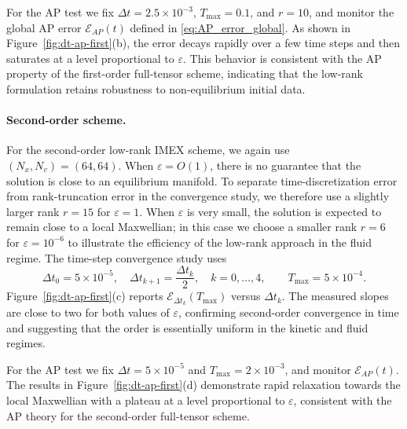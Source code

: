 \documentclass[]{article}
\numberwithin{equation}{section}
\begin{document}
For the AP test we fix $\Delta t=2.5\times 10^{-3}$, $T_{\max}=0.1$, and $r=10$, and monitor the global AP error $\mathcal E_{AP}(t)$ defined in \eqref{eq:AP_error_global}.
As shown in Figure~\ref{fig:dt-ap-first}(b), the error decays rapidly over a few time steps and then saturates at a level proportional to $\varepsilon$.
This behavior is consistent with the AP property of the first-order full-tensor scheme, indicating that the low-rank formulation retains robustness to non-equilibrium initial data.

\paragraph{Second-order scheme.}
For the second-order low-rank IMEX scheme, we again use $(N_x,N_v)=(64,64)$.
When $\varepsilon=O(1)$, there is no guarantee that the solution is close to an equilibrium manifold. To separate time-discretization error from rank-truncation error in the convergence study, we therefore use a slightly larger rank $r=15$ for $\varepsilon=1$.
When $\varepsilon$ is very small, the solution is expected to remain close to a local Maxwellian; in this case we choose a smaller rank $r=6$ for $\varepsilon=10^{-6}$ to illustrate the efficiency of the low-rank approach in the fluid regime. The time-step convergence study uses
\[
  \Delta t_0 = 5\times 10^{-5},\quad
  \Delta t_{k+1} = \frac{\Delta t_k}{2},\quad k=0,\dots,4,
  \qquad T_{\max}=5\times 10^{-4}.
\]
Figure~\ref{fig:dt-ap-first}(c) reports $\mathcal E_{\Delta t_k}(T_{\max})$ versus $\Delta t_k$. 
The measured slopes are close to two for both values of $\varepsilon$, confirming second-order convergence in time and suggesting that the order is essentially uniform in the kinetic and fluid regimes.

For the AP test we fix $\Delta t=5\times 10^{-5}$ and $T_{\max}=2\times 10^{-3}$, and monitor $\mathcal E_{AP}(t)$.
The results in Figure~\ref{fig:dt-ap-first}(d) demonstrate rapid relaxation towards the local Maxwellian with a plateau at a level proportional to $\varepsilon$, consistent with the AP theory for the second-order full-tensor scheme. %
\end{document}
